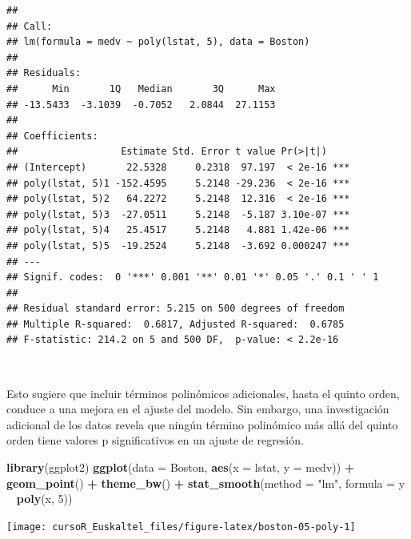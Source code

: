 \documentclass[]{book}
\newenvironment{Shaded}{\begin{snugshade}}{\end{snugshade}}
\newcommand{\KeywordTok}[1]{\textcolor[rgb]{0.13,0.29,0.53}{\textbf{#1}}}
\newcommand{\DataTypeTok}[1]{\textcolor[rgb]{0.13,0.29,0.53}{#1}}
\newcommand{\DecValTok}[1]{\textcolor[rgb]{0.00,0.00,0.81}{#1}}
\newcommand{\StringTok}[1]{\textcolor[rgb]{0.31,0.60,0.02}{#1}}
\newcommand{\OperatorTok}[1]{\textcolor[rgb]{0.81,0.36,0.00}{\textbf{#1}}}
\newcommand{\NormalTok}[1]{#1}
\begin{document}
\begin{verbatim}
## 
## Call:
## lm(formula = medv ~ poly(lstat, 5), data = Boston)
## 
## Residuals:
##      Min       1Q   Median       3Q      Max 
## -13.5433  -3.1039  -0.7052   2.0844  27.1153 
## 
## Coefficients:
##                  Estimate Std. Error t value Pr(>|t|)    
## (Intercept)       22.5328     0.2318  97.197  < 2e-16 ***
## poly(lstat, 5)1 -152.4595     5.2148 -29.236  < 2e-16 ***
## poly(lstat, 5)2   64.2272     5.2148  12.316  < 2e-16 ***
## poly(lstat, 5)3  -27.0511     5.2148  -5.187 3.10e-07 ***
## poly(lstat, 5)4   25.4517     5.2148   4.881 1.42e-06 ***
## poly(lstat, 5)5  -19.2524     5.2148  -3.692 0.000247 ***
## ---
## Signif. codes:  0 '***' 0.001 '**' 0.01 '*' 0.05 '.' 0.1 ' ' 1
## 
## Residual standard error: 5.215 on 500 degrees of freedom
## Multiple R-squared:  0.6817, Adjusted R-squared:  0.6785 
## F-statistic: 214.2 on 5 and 500 DF,  p-value: < 2.2e-16
\end{verbatim}

~

Esto sugiere que incluir términos polinómicos adicionales, hasta el
quinto orden, conduce a una mejora en el ajuste del modelo. Sin embargo,
una investigación adicional de los datos revela que ningún término
polinómico más allá del quinto orden tiene valores p significativos en
un ajuste de regresión.

\begin{Shaded}
\begin{Highlighting}[]
\KeywordTok{library}\NormalTok{(ggplot2)}
\KeywordTok{ggplot}\NormalTok{(}\DataTypeTok{data =}\NormalTok{ Boston, }\KeywordTok{aes}\NormalTok{(}\DataTypeTok{x =}\NormalTok{ lstat, }\DataTypeTok{y =}\NormalTok{ medv)) }\OperatorTok{+}\StringTok{ }
\StringTok{  }\KeywordTok{geom_point}\NormalTok{() }\OperatorTok{+}\StringTok{ }
\StringTok{  }\KeywordTok{theme_bw}\NormalTok{() }\OperatorTok{+}\StringTok{ }
\StringTok{  }\KeywordTok{stat_smooth}\NormalTok{(}\DataTypeTok{method =} \StringTok{"lm"}\NormalTok{, }\DataTypeTok{formula =}\NormalTok{ y }\OperatorTok{~}\StringTok{ }\KeywordTok{poly}\NormalTok{(x, }\DecValTok{5}\NormalTok{))}
\end{Highlighting}
\end{Shaded}

\begin{center}\texttt{[image: cursoR\_Euskaltel\_files/figure-latex/boston-05-poly-1]} \end{center}

~
\end{document}
